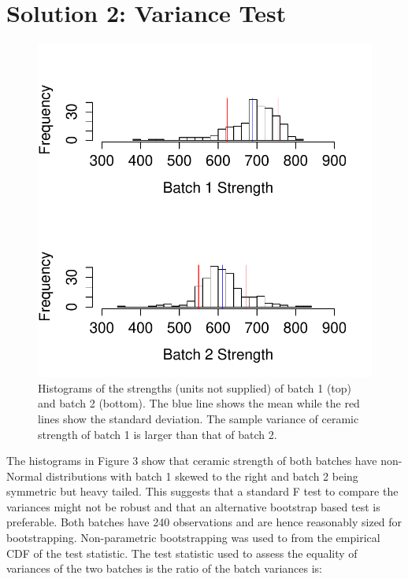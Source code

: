 \documentclass[a4paper, 10pt]{article}
\begin{document}
\section{Solution 2: Variance Test}
\begin{figure}[h]
\begin{center}
\includegraphics[scale=0.75]{batchHist.pdf}
\caption{Histograms of the strengths (units not supplied) of batch 1 (top) and batch 2 (bottom). The blue line shows the mean while the red lines show the standard deviation. The sample variance of ceramic strength of batch 1 is larger than that of batch 2.}
\label{F:Box}
\end{center}
\end{figure}

The histograms in Figure 3 show that ceramic strength of both batches have non-Normal distributions with batch 1 skewed to the right and batch 2 being symmetric but heavy tailed. This suggests that a standard F test to compare the variances might not be robust and that an alternative bootstrap based test is preferable. Both batches have 240 observations and are hence reasonably sized for bootstrapping. Non-parametric bootstrapping was used to from the empirical CDF of the test statistic. The test statistic used to assess the equality of variances of the two batches is the ratio of the batch variances is:
\end{document}
